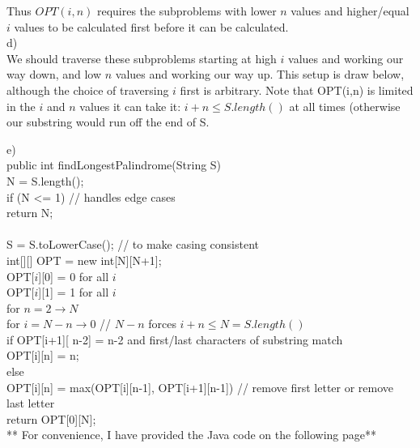 \documentclass[12pt,a4paper]{article}
\begin{document}
Thus $OPT(i,n)$ requires the subproblems with lower $n$ values and higher/equal $i$ values to be calculated first before it can be calculated. \\

d) \\

We should traverse these subproblems starting at high $i$ values and working our way down, and low $n$ values and working our way up. This setup is draw below, although the choice of traversing $i$ first is arbitrary. Note that OPT(i,n) is limited in the $i$ and $n$ values it can take it: $i + n \leq S.length()$ at all times (otherwise our substring would run off the end of S.\\

\vskip 5in

e) \\
public int findLongestPalindrome(String S)\\
N = S.length();\\
if (N <= 1) { // handles edge cases \\
return N;\\
}\\
S = S.toLowerCase();  // to make casing consistent\\
int[][] OPT = new int[N][N+1];\\
OPT[$i$][0] = 0 for all $i$\\
OPT[$i$][1] = 1 for all $i$\\
for $ n = 2 \rightarrow N$\\
for $i = N - n \rightarrow 0$ // $N - n$ forces $i + n \leq N = S.length()$\\
          if OPT[i+1][ n-2] = n-2 and first/last characters of substring match\\
                 OPT[i][n] = n;\\
          else\\
                OPT[i][n] = max(OPT[i][n-1], OPT[i+1][n-1]) // remove first letter or remove last letter\\
return OPT[0][N];\\

** For convenience, I have provided the Java code on the following page**\\
\end{document}
